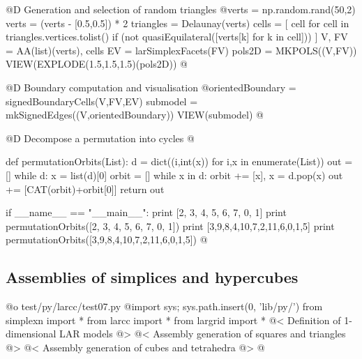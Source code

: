 \documentclass[11pt,oneside]{article}	%
\begin{document}
@D Generation and selection of random triangles 
@{verts = np.random.rand(50,2)
verts = (verts - [0.5,0.5]) * 2
triangles = Delaunay(verts)
cells = [ cell for cell in triangles.vertices.tolist()
		 if (not quasiEquilateral([verts[k] for k in cell])) ]
V, FV = AA(list)(verts), cells
EV = larSimplexFacets(FV)
pols2D = MKPOLS((V,FV))
VIEW(EXPLODE(1.5,1.5,1.5)(pols2D))
@}

@D Boundary computation and visualisation 
@{orientedBoundary = signedBoundaryCells(V,FV,EV)
submodel = mkSignedEdges((V,orientedBoundary))
VIEW(submodel)
@}


@D Decompose a permutation into cycles 
@{def permutationOrbits(List):
	d = dict((i,int(x)) for i,x in enumerate(List))
	out = []
	while d:
		x = list(d)[0]
		orbit = []
		while x in d:
			orbit += [x],
			x = d.pop(x)
		out += [CAT(orbit)+orbit[0]]
	return out
		
if __name__ == "__main__":
	print [2, 3, 4, 5, 6, 7, 0, 1]
	print permutationOrbits([2, 3, 4, 5, 6, 7, 0, 1])
	print [3,9,8,4,10,7,2,11,6,0,1,5]
	print permutationOrbits([3,9,8,4,10,7,2,11,6,0,1,5])
@}

\subsection{Assemblies of simplices and hypercubes}

@o test/py/larcc/test07.py
@{import sys; sys.path.insert(0, 'lib/py/')
from simplexn import *
from larcc import *
from largrid import *
@< Definition of 1-dimensional LAR models @>
@< Assembly generation of squares and triangles @>
@< Assembly generation  of cubes and tetrahedra @>
@}
\end{document}
